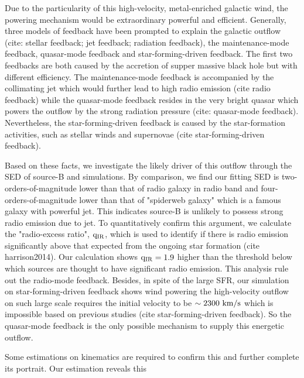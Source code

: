 \documentclass{nature}
\begin{document}
Due to the particularity of this high-velocity, metal-enriched galactic wind, the powering mechanism would be extraordinary powerful and efficient. Generally, three models of feedback have been prompted to explain the galactic outflow (cite: stellar feedback; jet feedback; radiation feedback), the maintenance-mode feedback, quasar-mode feedback and star-forming-driven feedback. The first two feedbacks are both caused by the accretion of supper massive black hole but with different efficiency. The maintenance-mode feedback is accompanied by the collimating jet which would further lead to high radio emission (cite radio feedback) while the quasar-mode feedback resides in the very bright quasar which powers the outflow by the strong radiation pressure (cite: quasar-mode feedback). Nevertheless, the star-forming-driven feedback is caused by the star-formation activities, such as stellar winds and supernovae (cite star-forming-driven feedback). 

Based on these facts, we investigate the likely driver of this outflow through the SED of source-B and simulations. By comparison, we find our fitting SED is two-orders-of-magnitude lower than that of radio galaxy in radio band and four-orders-of-magnitude lower than that of "spiderweb galaxy" which is a famous galaxy with powerful jet. This indicates source-B is unlikely to possess strong radio emission due to jet. To quantitatively confirm this argument, we calculate the "radio-excess ratio", $\rm q_{IR}$, which is used to identify if there is radio emission significantly above that expected from the ongoing star formation (cite harrison2014). Our calculation shows $\rm q_{IR}=1.9$ higher than the threshold below which sources are thought to have significant radio emission. This analysis rule out the radio-mode feedback. Besides, in spite of the large SFR, our simulation on star-forming-driven feedback shows wind powering the high-velocity outflow on such large scale requires the initial velocity to be $\rm \sim 2300 \ km/s$ which is impossible based on previous studies (cite star-forming-driven feedback). So the quasar-mode feedback is the only possible mechanism to supply this energetic outflow.

Some estimations on kinematics are required to confirm this and further complete its portrait. Our estimation reveals this 
\end{document}
